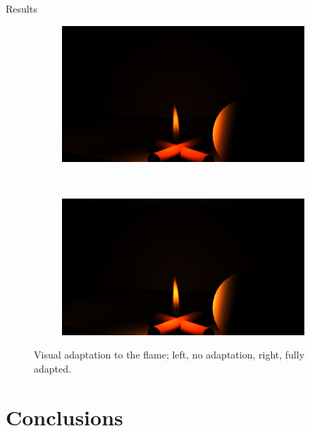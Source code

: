 \documentclass{beamer}
\begin{document}
\begin{frame}[allowframebreaks]{Results}
\begin{figure}[p]
        \centering
        \begin{subfigure}[b]{0.25\textwidth}
                \includegraphics[width=\textwidth, trim={14.5cm 2.5cm 16.5cm 10.5cm}, clip]{img/result_propane_shadows}
        \end{subfigure}%
        ~ 
        \begin{subfigure}[b]{0.25\textwidth}
                \includegraphics[width=\textwidth, trim={14.5cm 2.5cm 16.5cm 10.5cm}, clip]{img/result_propane_1_v}
        \end{subfigure}%
        \caption*{Visual adaptation to the flame; left, no adaptation, right, fully adapted.}
\end{figure}

\end{frame}

\section{Conclusions}
\end{document}
